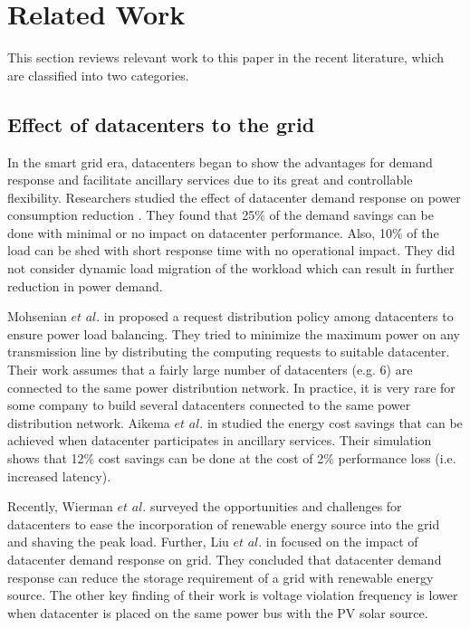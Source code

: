 \section{Related Work}
\label{sec:related}

This section reviews relevant work to this paper in the recent literature, which are classified into two categories.

\subsection{Effect of datacenters to the grid}

In the smart grid era, datacenters began to show the advantages for demand response and facilitate ancillary services due to its great and controllable flexibility. Researchers studied the effect of datacenter demand response on power consumption reduction \cite{lbnl12shortstudy, lbnl12report}. They found that 25\% of the demand savings can be done with minimal or no impact on datacenter performance. Also, 10\% of the load can be shed with short response time with no operational impact. They did not consider dynamic load migration of the workload which can result in further reduction in power demand. 	

Mohsenian $\textit{et al.}$ in \cite{Mohsenian-Rad10grid} proposed a request distribution policy among datacenters to ensure power load balancing. They tried to minimize the maximum power on any transmission line by distributing the computing requests to suitable datacenter. Their work assumes that a fairly large number of datacenters (e.g. 6) are connected to the same power distribution network. In practice, it is very rare for some company to build several datacenters connected to the same power distribution network.
Aikema $\textit{et al.}$ in \cite{Aikema12} studied the energy cost savings that can be achieved when datacenter participates in ancillary services. Their simulation shows that 12\% cost savings can be done at the cost of 2\% performance loss (i.e. increased latency).

Recently, Wierman $\textit{et al.}$ \cite{AdamWierman2014} surveyed the opportunities and challenges for datacenters to ease the incorporation of renewable energy source into the grid and shaving the peak load. Further, Liu $\textit{et al.}$ in \cite{liu2014pricing} focused on the impact of datacenter demand response on grid. They concluded that datacenter demand response can reduce the storage requirement of a grid with renewable energy source. The other key finding of their work is voltage violation frequency is lower when datacenter is placed on the same power bus with the PV solar source.

